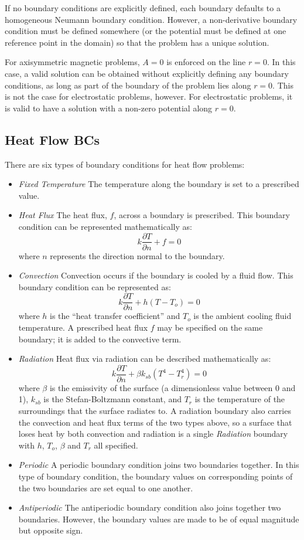 \documentclass[12pt]{report}
\newcommand{\be}{\begin{equation}}
\newcommand{\ee}{\end{equation}}
\begin{document}
If no boundary conditions are explicitly defined, each boundary
defaults to a homogeneous Neumann boundary condition. However, a
non-derivative boundary condition must be defined somewhere (or the
potential must be defined at one reference point in the domain) so
that the problem has a unique solution.

For axisymmetric magnetic problems, $A=0$ is enforced on the line
$r=0$. In this case, a valid solution can be obtained without
explicitly defining any boundary conditions, as long as part of the
boundary of the problem lies along $r=0$.  This is not the case for
electrostatic problems, however.  For electrostatic problems, it is
valid to have a solution with a non-zero potential along $r=0$.

\subsection{Heat Flow BCs}
There are six types of boundary conditions for heat flow problems:

\begin{itemize}
\item {\em Fixed Temperature} The temperature along the boundary is
set to a prescribed value.
\item {\em Heat Flux} The heat flux, $f$, across a boundary is prescribed.  This
boundary condition can be represented mathematically as:
\be k \frac{\partial T}{\partial n} + f = 0 \ee
where $n$ represents the direction normal to the boundary.
\item {\em Convection} Convection occurs if the boundary is cooled by a fluid flow.
This boundary condition can be represented as:
\be k \frac{\partial T}{\partial n} + h \left( T - T_o \right) = 0 \ee
where $h$ is the ``heat transfer coefficient'' and $T_o$ is the ambient
cooling fluid temperature.  A prescribed heat flux $f$ may be specified
on the same boundary; it is added to the convective term.
\item {\em Radiation}
Heat flux via radiation can be described mathematically as:
\be k \frac{\partial T}{\partial n} + \beta k_{sb} \left( T^4 - T_r^4 \right) = 0 \ee
where $\beta$ is the emissivity of the surface (a dimensionless value between 0 and 1),
$k_{sb}$ is the Stefan-Boltzmann constant, and $T_r$ is the temperature of
the surroundings that the surface radiates to.  A radiation boundary also
carries the convection and heat flux terms of the two types above, so a
surface that loses heat by both convection and radiation is a single
{\em Radiation} boundary with $h$, $T_o$, $\beta$ and $T_r$ all specified.
\item {\em Periodic}
A periodic boundary condition joins two boundaries together.  In this
type of boundary condition, the boundary values on 
corresponding points of the two boundaries are set equal to one another.
\item {\em Antiperiodic}
The antiperiodic boundary condition also joins together two boundaries.
However, the boundary values are made to be of equal magnitude but
opposite sign.
\end{itemize}
\end{document}
